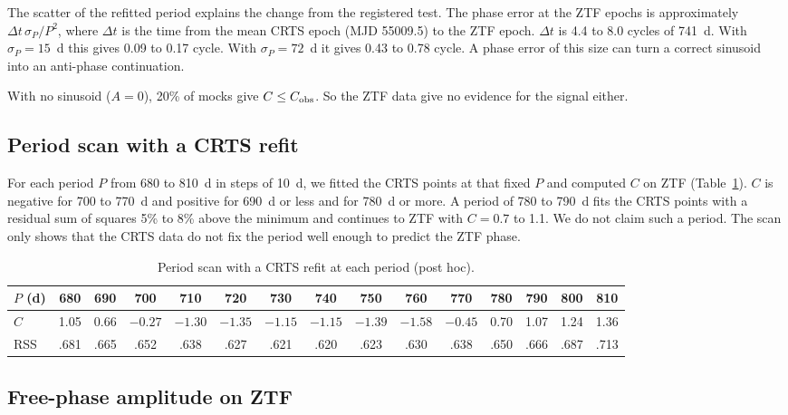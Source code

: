 \documentclass[11pt]{article}
\newcommand{\Cobs}{C_{\rm obs}}
\begin{document}
The scatter of the refitted period explains the change from the registered test. The phase error at the ZTF epochs is approximately $\Delta t\,\sigma_P/P^2$, where $\Delta t$ is the time from the mean CRTS epoch (MJD 55009.5) to the ZTF epoch. $\Delta t$ is 4.4 to 8.0 cycles of 741~d. With $\sigma_P = 15$~d this gives 0.09 to 0.17 cycle. With $\sigma_P = 72$~d it gives 0.43 to 0.78 cycle. A phase error of this size can turn a correct sinusoid into an anti-phase continuation.

With no sinusoid ($A = 0$), 20\% of mocks give $C \le \Cobs$. So the ZTF data give no evidence for the signal either.

\subsection{Period scan with a CRTS refit}

For each period $P$ from 680 to 810~d in steps of 10~d, we fitted the CRTS points at that fixed $P$ and computed $C$ on ZTF (Table~\ref{tab:scan}). $C$ is negative for 700 to 770~d and positive for 690~d or less and for 780~d or more. A period of 780 to 790~d fits the CRTS points with a residual sum of squares 5\% to 8\% above the minimum and continues to ZTF with $C = 0.7$ to 1.1. We do not claim such a period. The scan only shows that the CRTS data do not fix the period well enough to predict the ZTF phase.

\begin{table}[h]
\centering
\caption{Period scan with a CRTS refit at each period (post hoc).}
\label{tab:scan}
\footnotesize\setlength{\tabcolsep}{3pt}
\begin{tabular}{l*{14}{c}}
\toprule
$P$ (d) & 680 & 690 & 700 & 710 & 720 & 730 & 740 & 750 & 760 & 770 & 780 & 790 & 800 & 810 \\
\midrule
$C$ & 1.05 & 0.66 & $-0.27$ & $-1.30$ & $-1.35$ & $-1.15$ & $-1.15$ & $-1.39$ & $-1.58$ & $-0.45$ & 0.70 & 1.07 & 1.24 & 1.36 \\
RSS & .681 & .665 & .652 & .638 & .627 & .621 & .620 & .623 & .630 & .638 & .650 & .666 & .687 & .713 \\
\bottomrule
\end{tabular}
\end{table}

\subsection{Free-phase amplitude on ZTF}
\end{document}
